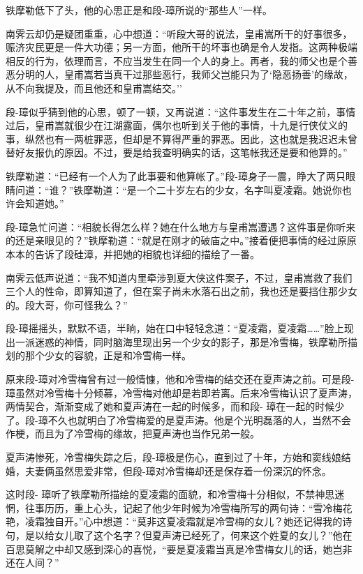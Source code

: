 \documentclass[12pt,oneside]{book}
\begin{document}
铁摩勒低下了头，他的心思正是和段-璋所说的``那些人''一样。

南霁云却仍是疑团重重，心中想道：``听段大哥的说法，皇甫嵩所干的好事很多，赈济灾民更是一件大功德；另一方面，他所干的坏事也确是令人发指。这两种极端相反的行为，依理而言，不应当发生在同一个人的身上。再者，我的师父也是个善恶分明的人，皇甫嵩若当真干过那些恶行，我师父岂能只为了`隐恶扬善'的缘故，从不向我提及，而且他还和皇甫嵩结交。''

段-璋似乎猜到他的心思，顿了一顿，又再说道：``这件事发生在二十年之前，事情过后，皇甫嵩就很少在江湖露面，偶尔也听到关于他的事情，十九是行侠仗义的事，纵然也有一两桩罪恶，但却是不算得严重的罪恶。因此，这也就是我迟迟未曾替好友报仇的原因。不过，要是给我查明确实的话，这笔帐我还是要和他算的。''

铁摩勒道：``已经有一个人为了此事要和他算帐了。''段-璋身子一震，睁大了两只眼睛问道：``谁？''铁摩勒道：``是一个二十岁左右的少女，名字叫夏凌霜。她说你也许会知道她。''

段-璋急忙问道：``相貌长得怎么样？她在什么地方与皇甫嵩遭遇？这件事是你听来的还是亲眼见的？''铁摩勒道：``就是在刚才的破庙之中。''接着便把事情的经过原原本本的告诉了段硅漳，并把她的相貌也详细的描绘了一番。

南霁云低声说道：``我不知道内里牵涉到夏大侠这件案子，不过，皇甫嵩救了我们三个人的性命，即算知道了，但在案子尚未水落石出之前，我也还是要挡住那少女的。段大哥，你可怪我么？''

段-璋摇摇头，默默不语，半晌，始在口中轻轻念道：``夏凌霜，夏凌霜\ldots\ldots{}''脸上现出一派迷惑的神情，同时脑海里现出另一个少女的影子，那是冷雪梅，铁摩勒所描划的那个少女的容貌，正是和冷雪梅一样。

原来段-璋对冷雪梅曾有过一般情慷，他和冷雪梅的结交还在夏声涛之前。可是段-
璋虽然对冷雪梅十分倾慕，冷雪梅对他却是若即若离。后来冷雪梅认识了夏声涛，两情契合，渐渐变成了她和夏声涛在一起的时候多，而和段-
璋在一起的时候少了。段-璋不久也就明白了冷雪梅爱的是夏声涛。他是个光明磊落的人，当然不会作梗，而且为了冷雪梅的缘故，把夏声涛也当作兄弟一般。

夏声涛惨死，冷雪梅失踪之后，段-璋极是伤心，直到过了十年，方始和窦线娘结婚，夫妻俩虽然思爱非常，但段-璋对冷雪梅却还是保存着一份深沉的怀念。

这时段-
璋听了铁摩勒所描绘的夏凌霜的面貌，和冷雪梅十分相似，不禁神思迷惘，往事历历，重上心头，记起了他少年时候为冷雪梅所写的两句诗：``雪冷梅花艳，凌霜独自开。''心中想道：``莫非这夏凌霜就是冷雪梅的女儿？她还记得我的诗句，是以给女儿取了这个名字？但夏声涛已经死了，何来这个姓夏的女儿？''他在百思莫解之中却又感到深心的喜悦，``要是夏凌霜当真是冷雪梅女儿的话，她岂非还在人间？''
\end{document}
